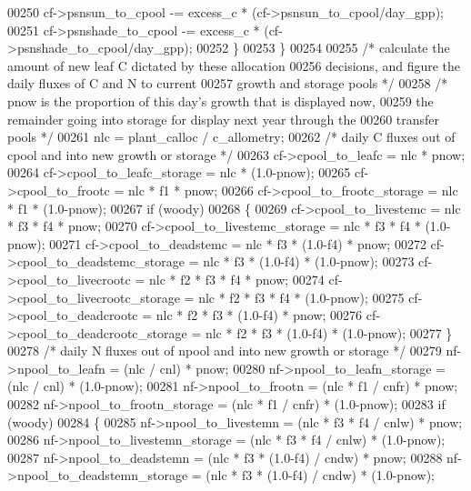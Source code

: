 \begin{DoxyCode}
00250             cf->psnsun\_to\_cpool -= excess\_c * (cf->psnsun\_to\_cpool/day\_gpp);
00251             cf->psnshade\_to\_cpool -= excess\_c * (cf->psnshade\_to\_cpool/day\_gpp);
00252         \}
00253     \}
00254     
00255     \textcolor{comment}{/* calculate the amount of new leaf C dictated by these allocation}
00256 \textcolor{comment}{    decisions, and figure the daily fluxes of C and N to current}
00257 \textcolor{comment}{    growth and storage pools */}
00258     \textcolor{comment}{/* pnow is the proportion of this day's growth that is displayed now,}
00259 \textcolor{comment}{    the remainder going into storage for display next year through the}
00260 \textcolor{comment}{    transfer pools */}
00261     nlc = plant\_calloc / c\_allometry;
00262     \textcolor{comment}{/* daily C fluxes out of cpool and into new growth or storage */}
00263     cf->cpool\_to\_leafc              = nlc * pnow;
00264     cf->cpool\_to\_leafc\_storage      = nlc * (1.0-pnow);
00265     cf->cpool\_to\_frootc             = nlc * f1 * pnow;
00266     cf->cpool\_to\_frootc\_storage     = nlc * f1 * (1.0-pnow);
00267     \textcolor{keywordflow}{if} (woody)
00268     \{
00269         cf->cpool\_to\_livestemc          = nlc * f3 * f4 * pnow;
00270         cf->cpool\_to\_livestemc\_storage  = nlc * f3 * f4 * (1.0-pnow);
00271         cf->cpool\_to\_deadstemc          = nlc * f3 * (1.0-f4) * pnow;
00272         cf->cpool\_to\_deadstemc\_storage  = nlc * f3 * (1.0-f4) * (1.0-pnow);
00273         cf->cpool\_to\_livecrootc         = nlc * f2 * f3 * f4 * pnow;
00274         cf->cpool\_to\_livecrootc\_storage = nlc * f2 * f3 * f4 * (1.0-pnow);
00275         cf->cpool\_to\_deadcrootc         = nlc * f2 * f3 * (1.0-f4) * pnow;
00276         cf->cpool\_to\_deadcrootc\_storage = nlc * f2 * f3 * (1.0-f4) * (1.0-pnow);
00277     \}
00278     \textcolor{comment}{/* daily N fluxes out of npool and into new growth or storage */}
00279     nf->npool\_to\_leafn              = (nlc / cnl) * pnow;
00280     nf->npool\_to\_leafn\_storage      = (nlc / cnl) * (1.0-pnow);
00281     nf->npool\_to\_frootn             = (nlc * f1 / cnfr) * pnow;
00282     nf->npool\_to\_frootn\_storage     = (nlc * f1 / cnfr) * (1.0-pnow);
00283     \textcolor{keywordflow}{if} (woody)
00284     \{
00285         nf->npool\_to\_livestemn          = (nlc * f3 * f4 / cnlw) * pnow;
00286         nf->npool\_to\_livestemn\_storage  = (nlc * f3 * f4 / cnlw) * (1.0-pnow);
00287         nf->npool\_to\_deadstemn          = (nlc * f3 * (1.0-f4) / cndw) * pnow;
00288         nf->npool\_to\_deadstemn\_storage  = (nlc * f3 * (1.0-f4) / cndw) * (1.0-pnow);

\end{DoxyCode}
